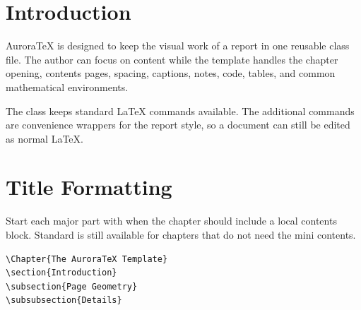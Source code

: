 

\section{Introduction}

AuroraTeX is designed to keep the visual work of a report in one reusable
class file. The author can focus on content while the template handles the
chapter opening, contents pages, spacing, captions, notes, code, tables, and
common mathematical environments.

\begin{warning}
The class keeps standard LaTeX commands available. The additional commands are
convenience wrappers for the report style, so a document can still be edited as
normal LaTeX.
\end{warning}

\section{Title Formatting}

Start each major part with  when the
chapter should include a local contents block. Standard
 is still available for chapters that
do not need the mini contents.

\begin{lstlisting}[language={[LaTeX]TeX},style=AuroraListing]
\Chapter{The AuroraTeX Template}
\section{Introduction}
\subsection{Page Geometry}
\subsubsection{Details}
\end{lstlisting}

